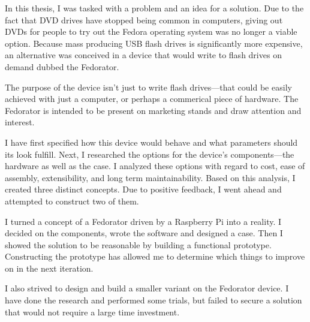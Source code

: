 \label{Conclusion}
        
        In this thesis, I was tasked with a problem and an idea for a solution.  Due to the fact that DVD drives have stopped being common in computers, giving out DVDs for people to try out the Fedora operating system was no longer a viable option.  Because mass producing USB flash drives is significantly more expensive, an alternative was conceived in a device that would write to flash drives on demand dubbed the Fedorator.
        
        The purpose of the device isn't just to write flash drives—that could be easily achieved with just a computer, or perhaps a commerical piece of hardware.  The Fedorator is intended to be present on marketing stands and draw attention and interest.
        
        I have first specified how this device would behave and what parameters should its look fulfill.  Next, I researched the options for the device's components—the hardware as well as the case.  I analyzed these options with regard to cost, ease of assembly, extensibility, and long term maintainability.  Based on this analysis, I created three distinct concepts.  Due to positive feedback, I went ahead and attempted to construct two of them.
        
        I turned a concept of a Fedorator driven by a Raspberry Pi into a reality.  I decided on the components, wrote the software and designed a case.  Then I showed the solution to be reasonable by building a functional prototype.  Constructing the prototype has allowed me to determine which things to improve on in the next iteration.
        
        I also strived to design and build a smaller variant on the Fedorator device.  I have done the research and performed some trials, but failed to secure a solution that would not require a large time investment.%
        
